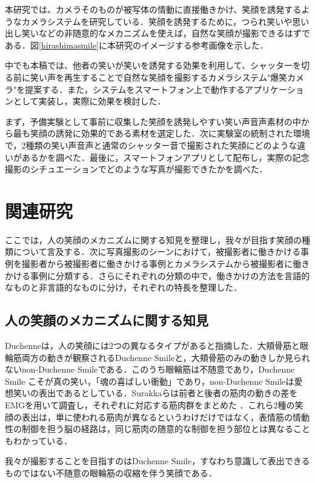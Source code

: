 \documentclass[submit,techreq]{ec2014}
\begin{document}
本研究では、カメラそのものが被写体の情動に直接働きかけ、笑顔を誘発するようなカメラシステムを研究している．笑顔を誘発するために，つられ笑いや思い出し笑いなどの非随意的なメカニズムを使えば，自然な笑顔が撮影できるはずである．図\ref{hirashimasmile}に本研究のイメージする参考画像を示した．

中でも本稿では、他者の笑いが笑いを誘発する効果を利用して、シャッターを切る前に笑い声を再生することで自然な笑顔を撮影するカメラシステム"爆笑カメラ"を提案する．また，システムをスマートフォン上で動作するアプリケーションとして実装し，実際に効果を検討した．


まず，予備実験として事前に収集した笑顔を誘発しやすい笑い声音声素材の中から最も笑顔の誘発に効果的である素材を選定した．次に実験室の統制された環境で，2種類の笑い声音声と通常のシャッター音で撮影された笑顔にどのような違いがあるかを調べた．最後に，スマートフォンアプリとして配布し，実際の記念撮影のシチュエーションでどのような写真が撮影できたかを調べた．

\section{関連研究}

ここでは，人の笑顔のメカニズムに関する知見を整理し，我々が目指す笑顔の種類について言及する．次に写真撮影のシーンにおけて，被撮影者に働きかける事例を撮影者から被撮影者に働きかける事例とカメラシステムから被撮影者に働きかける事例に分類する．さらにそれぞれの分類の中で，働きかけの方法を言語的なものと非言語的なものに分け，それぞれの特長を整理した．

\subsection{人の笑顔のメカニズムに関する知見}

Duchenneは，人の笑顔には2つの異なるタイプがあると指摘した．大頬骨筋と眼輪筋両方の動きが観察されるDuchenne Smileと，大頬骨筋のみの動きしか見られないnon-Duchenne Smileである\cite{de1990mechanism}．このうち眼輪筋は不随意であり，Duchenne Smile こそが真の笑い，「魂の喜ばしい衝動」であり，non-Duchenne Smileは愛想笑いの表出であるとしている．Surakkaらは前者と後者の筋肉の動きの差をEMGを用いて調査し，それぞれに対応する筋肉群をまとめた \cite{surakka1998facial}．これら2種の笑顔の表出は，単に使われる筋肉が異なるというわけだけではなく，表情筋の情動性の制御を担う脳の経路は，同じ筋肉の随意的な制御を担う部位とは異なることもわかっている\cite{tanaka201007}．

我々が撮影することを目指すのはDuchenne Smile，すなわち意識して表出できるものではない不随意の眼輪筋の収縮を伴う笑顔である．
\end{document}
